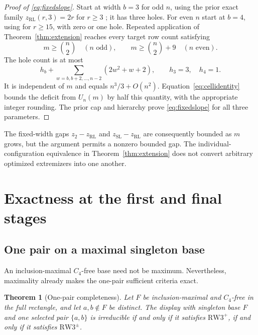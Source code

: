 \documentclass[11pt,a4paper]{article}
\newtheorem{theorem}{Theorem}[section]
\theoremstyle{definition}
\newcommand{\zr}{z_{\mathrm{RL}}}
\newcommand{\zs}{z_{\mathrm{SL}}}
\newcommand{\zt}{z_2}
\newcommand{\RW}{\mathrm{RW3}^{+}}
\newcommand{\SG}{\mathrm{RW3}^{\pm}}
\begin{document}
\begin{proof}[Proof of \eqref{eq:fixedslope}]
Start at width $b=3$ for odd $n$, using the prior exact family
$\zr(r,3)=2r$ for $r\ge3$ \cite{LQ}; it has three holes.
For even $n$ start at $b=4$, using \cite{CC} for $r\ge15$, with
zero or one hole. Repeated application of Theorem~\ref{thm:extension}
reaches every target row count satisfying
\[
 m\ge\binom n2\quad(n\text{ odd}),\qquad
 m\ge\binom n2+9\quad(n\text{ even}).
\]
The hole count is at most
\begin{equation}\label{eq:holepolynomial}
 h_b+\sum_{w=b,b+2,\ldots,n-2}(2w^2+w+2),
 \qquad h_3=3,\quad h_4=1.
\end{equation}
It is independent of $m$ and equals $n^3/3+O(n^2)$.
Equation~\eqref{eq:cellidentity} bounds the deficit from $U_n(m)$ by
half this quantity, with the appropriate integer rounding. The prior
cap and hierarchy prove \eqref{eq:fixedslope} for all three parameters.
\end{proof}

The fixed-width gaps $\zt-\zr$ and $\zs-\zr$ are consequently bounded
as $m$ grows, but the argument permits a nonzero bounded gap. The
individual-configuration equivalence in Theorem~\ref{thm:extension}
does not convert arbitrary optimized extremizers into one another.

\section{Exactness at the first and final stages}\subsection{One pair on a maximal singleton base}\label{sec:unary}

An inclusion-maximal $C_4$-free base need not be maximum. Nevertheless,
maximality already makes the one-pair sufficient criteria exact.

\begin{theorem}[One-pair completeness]\label{thm:unary}
Let $F$ be inclusion-maximal and $C_4$-free in the full rectangle, and
let $a,b\notin F$ be distinct. The display with singleton base $F$ and
one selected pair $\{a,b\}$ is irreducible if and only if it satisfies
$\RW$, if and only if it satisfies $\SG$.
\end{theorem}
\end{document}
